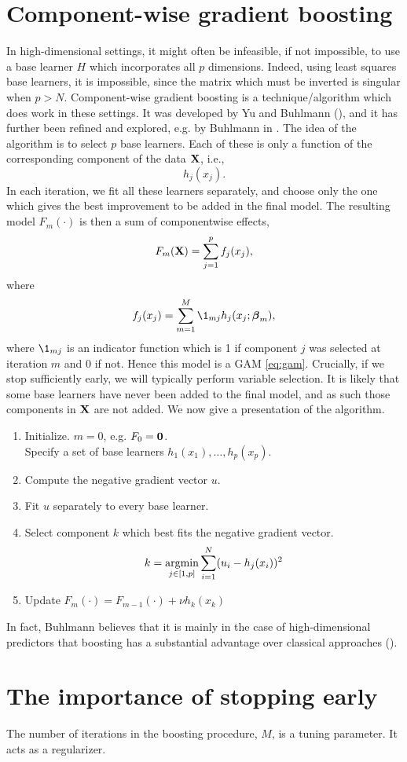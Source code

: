 \section{Component-wise gradient boosting}
In high-dimensional settings, it might often be infeasible, if not impossible, to use a base learner $H$ which incorporates all $p$ dimensions. Indeed, using least squares base learners, it is impossible, since the matrix which must be inverted is singular when $p>N$. Component-wise gradient boosting is a technique/algorithm which does work in these settings. It was developed by Yu and Buhlmann (\cite{buhlmann-yu}), and it has further been refined and explored, e.g. by Buhlmann in \cite{buhlmann2006}. The idea of the algorithm is to select $p$ base learners. Each of these is only a function of the corresponding component of the data $\mathbf{X}$, i.e.,
\begin{equation*}
    h_j(x_j).
\end{equation*}
In each iteration, we fit all these learners separately, and choose only the one which gives the best improvement to be added in the final model. The resulting model $F_m(\cdot)$ is then a sum of componentwise effects,
\begin{equation*}
    F_m(\mathbf{X})=\sum_{j=1}^pf_j(x_j),
\end{equation*}
where
\begin{equation*}
    f_j(x_j)=\sum_{m=1}^M\1_{mj}h_j(x_j;\bbeta_m),
\end{equation*}
where $\1_{mj}$ is an indicator function which is 1 if component $j$ was selected at iteration $m$ and 0 if not.
Hence this model is a GAM \eqref{eq:gam}. Crucially, if we stop sufficiently early, we will typically perform variable selection. It is likely that some base learners have never been added to the final model, and as such those components in $\mathbf{X}$ are not added. We now give a presentation of the algorithm.
\begin{enumerate}
    \item Initialize. $m=0$, e.g. $F_0=\mathbf{0}$.\\
    Specify a set of base learners $h_1(x_1),\dotsc,h_p(x_p)$.
    \item Compute the negative gradient vector $u$.
    \item Fit $u$ separately to every base learner.
    \item Select component $k$ which best fits the negative gradient vector.
        \begin{equation*}
            k=\operatorname*{argmin}_{j\in[1,p]}\sum_{i=1}^N(u_i-h_j(x_i))^2
        \end{equation*}
    \item Update $F_m(\cdot)=F_{m-1}(\cdot)+\nu h_k(x_k)$
\end{enumerate}
In fact, Buhlmann believes that it is mainly in the case of high-dimensional predictors that boosting has a substantial advantage over classical approaches (\cite{buhlmann2006}).

\section{The importance of stopping early}
The number of iterations in the boosting procedure, $M$, is a tuning parameter. It acts as a regularizer.
